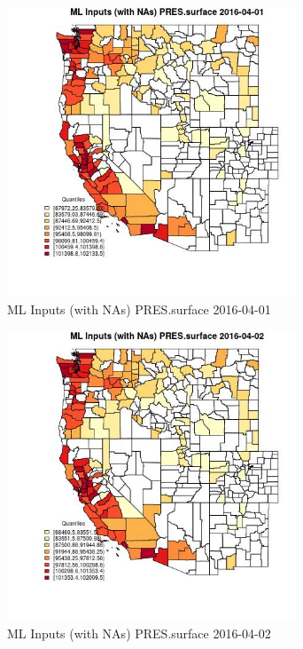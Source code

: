 \begin{figure} 
\centering  
\includegraphics[width=0.77\textwidth]{Code_Outputs/Report_ML_input_PM25_Step4_part_e_de_duplicated_aveswNAs_CountyPRESsurfaceMean2016-04-01_2016-04-01.jpg} 
\caption{\label{fig:Report_ML_input_PM25_Step4_part_e_de_duplicated_aveswNAsCountyPRESsurfaceMean2016-04-01_2016-04-01}ML Inputs (with NAs) PRES.surface 2016-04-01} 
\end{figure} 
 

\begin{figure} 
\centering  
\includegraphics[width=0.77\textwidth]{Code_Outputs/Report_ML_input_PM25_Step4_part_e_de_duplicated_aveswNAs_CountyPRESsurfaceMean2016-04-02_2016-04-02.jpg} 
\caption{\label{fig:Report_ML_input_PM25_Step4_part_e_de_duplicated_aveswNAsCountyPRESsurfaceMean2016-04-02_2016-04-02}ML Inputs (with NAs) PRES.surface 2016-04-02} 
\end{figure} 
 

